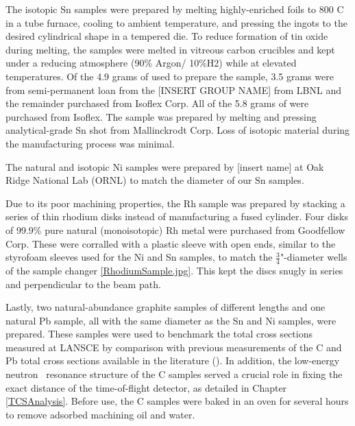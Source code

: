 The isotopic Sn samples were prepared by melting highly-enriched foils to
800 C in a tube furnace, cooling to ambient temperature, and pressing the ingots
to the desired cylindrical shape in a tempered die. To reduce formation of tin
oxide during melting, the samples were melted in vitreous carbon crucibles
and kept under a reducing atmosphere (90\% Argon/ 10\%H2) while at elevated
temperatures. Of the 4.9 grams of \snTwelve used to prepare the sample,
3.5 grams were from semi-permanent loan from the [INSERT GROUP NAME] from LBNL
and the remainder purchased from Isoflex Corp. All of the 5.8 grams of \snFour
were purchased from Isoflex. The \snNat sample was prepared by melting and
pressing analytical-grade Sn shot from Mallinckrodt Corp. Loss of isotopic
material during the manufacturing process was minimal.

The natural and isotopic Ni samples were prepared by [insert name] at Oak Ridge
National Lab (ORNL) to match the diameter of our Sn samples.

Due to its poor machining properties, the Rh sample was prepared by
stacking a series of thin rhodium disks instead of manufacturing a
fused cylinder. Four disks of 99.9\% pure natural (monoisotopic) Rh metal were purchased from
Goodfellow Corp. These were corralled with a
plastic sleeve with open ends, similar to the styrofoam sleeves used for the Ni
and Sn samples, to match the $\frac{3}{4}$"-diameter wells of the sample changer
\ref{RhodiumSample.jpg}.
This kept the discs snugly in series and perpendicular to the beam path.

Lastly, two natural-abundance graphite samples of different lengths and one
natural Pb sample, all with the same diameter as the Sn and Ni samples, were
prepared. These samples were used to benchmark the total cross sections
measured at LANSCE by comparison with previous measurements of the C and
Pb total cross sections available in the literature
(\cite{Finlay1993,Abfalterer2001}). In addition, the low-energy neutron \tot\ resonance
structure of the C samples served a crucial role in fixing the exact distance
of the time-of-flight detector, as detailed in Chapter \ref{TCSAnalysis}.
Before use, the C samples were baked in an oven for several
hours to remove adsorbed machining oil and water.

